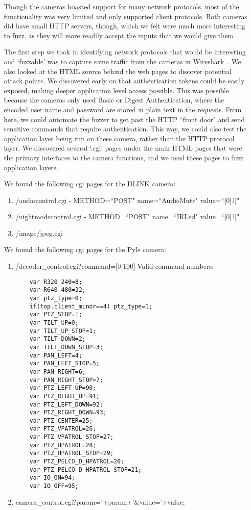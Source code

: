 \documentclass[letterpaper,twocolumn,10pt]{article}
\begin{document}
Though the cameras boasted support for many network protocols, most of the functionality was very limited and only supported client protocols. Both cameras did have small HTTP servers, though, which we felt were much more interesting to fuzz, as they will more readily accept the inputs that we would give them. 

The first step we took in identifying network protocols that would be interesting and `fuzzable' was to capture some traffic from the cameras in Wireshark~\cite{wireshark}. We also looked at the HTML source behind the web pages to discover potential attack points. We discovered early on that authentication tokens could be easily exposed, making deeper application level access possible. This was possible because the cameras only used Basic or Digest Authentication, where the encoded user name and password are stored in plain text in the requests. From here, we could automate the fuzzer to get past the HTTP ``front door" and send sensitive commands that require authentication. This way, we could also test the application layer being run on these camera, rather than the HTTP protocol layer. We discovered several `.cgi' pages under the main HTML pages that were the primary interfaces to the camera functions, and we used these pages to fuzz application layers.

We found the following cgi pages for the DLINK camera: 


\begin{enumerate}
	\item /audiocontrol.cgi - METHOD=``POST" name=``AudioMute" value=``[0$\mid$1]"
	\item /nightmodecontrol.cgi - METHOD=``POST" name=``IRLed" value=``[0$\mid$1]"
	\item /image/jpeg.cgi
\end{enumerate}

We found the following cgi pages for the Pyle camera:
\begin{enumerate}
	\item /decoder\_control.cgi?command=[0$\mid$100]
	\newline Valid command numbers:
	\begin{verbatim}
	var R320_240=8;
	var R640_480=32;
	var ptz_type=0;	
	if(top.client_minor==4) ptz_type=1;
	var PTZ_STOP=1;
	var TILT_UP=0;
	var TILT_UP_STOP=1;
	var TILT_DOWN=2;
	var TILT_DOWN_STOP=3;
	var PAN_LEFT=4;
	var PAN_LEFT_STOP=5;
	var PAN_RIGHT=6;
	var PAN_RIGHT_STOP=7;
	var PTZ_LEFT_UP=90;
	var PTZ_RIGHT_UP=91;
	var PTZ_LEFT_DOWN=92;
	var PTZ_RIGHT_DOWN=93;
	var PTZ_CENTER=25;
	var PTZ_VPATROL=26;
	var PTZ_VPATROL_STOP=27;
	var PTZ_HPATROL=28;
	var PTZ_HPATROL_STOP=29;
	var PTZ_PELCO_D_HPATROL=20;
	var PTZ_PELCO_D_HPATROL_STOP=21;
	var IO_ON=94;
	var IO_OFF=95;
	\end{verbatim}
	\item camera\_control.cgi?param='+param+'\&value='+value; 
\end{enumerate}
\end{document}
